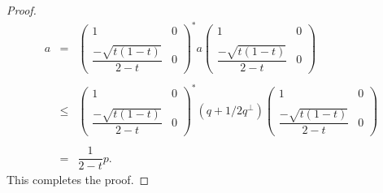 \documentclass[10pt,a4paper]{amsart}
\begin{document}
\begin{proof}
$$\begin{array}{llllllll}
	a&=&\begin{pmatrix}
		1 & 0 \\ \\
		\dfrac{-\sqrt{t(1-t)}}{2-t} & 0
	\end{pmatrix}^*a\begin{pmatrix}
		1 & 0 \\ \\
		\dfrac{-\sqrt{t(1-t)}}{2-t} & 0
	\end{pmatrix}\\\\
	&\leq& \begin{pmatrix}
		1 & 0 \\ \\
		\dfrac{-\sqrt{t(1-t)}}{2-t} & 0
	\end{pmatrix}^*  (q+1/2q^\perp) \begin{pmatrix}
		1 & 0 \\ \\
		\dfrac{-\sqrt{t(1-t)}}{2-t} & 0
	\end{pmatrix}\\\\
	&=& \dfrac{1}{2-t}p.
\end{array}$$	
This completes the proof.
\end{proof}
\end{document}
